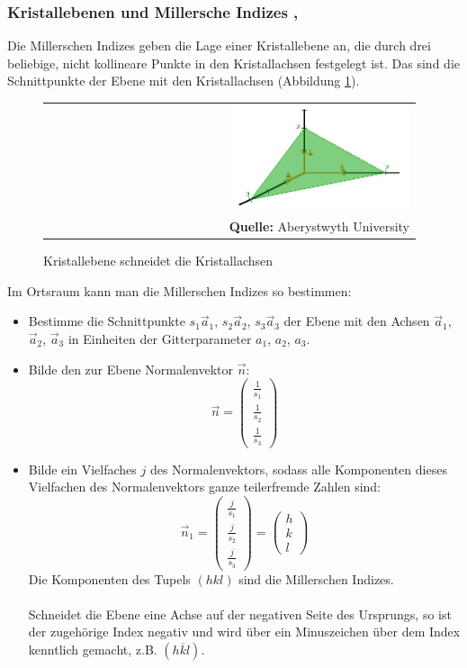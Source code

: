 \documentclass[a4paper,titlepage]{scrartcl}
\numberwithin{equation}{section}
\begin{document}
\subsubsection{Kristallebenen und Millersche Indizes \cite{wiki:miller}, \cite{kittel}}
Die Millerschen Indizes geben die Lage einer Kristallebene an, die durch drei beliebige, nicht kollineare Punkte in den Kristallachsen festgelegt ist. Das sind die Schnittpunkte der Ebene mit den Kristallachsen (Abbildung \ref{fig:miller}).
\begin{figure}[H]
	\centering
	\begin{tabular}{@{}r@{}}
		\includegraphics[width=0.5\textwidth]{images/bravaismiller.png}\\
		\footnotesize\sffamily\textbf{Quelle:} Aberystwyth University \cite{miller}
	\end{tabular}
	\caption{Kristallebene schneidet die Kristallachsen}
    \label{fig:miller}
\end{figure}
Im Ortsraum kann man die Millerschen Indizes so bestimmen:
\begin{itemize}
\item Bestimme die Schnittpunkte $s_1 \vec{a}_1$, $s_2 \vec{a}_2$, $s_3 \vec{a}_3$ der Ebene mit den Achsen $\vec{a}_1$, $\vec{a}_2$, $\vec{a}_3$ in Einheiten der Gitterparameter $a_1$, $a_2$, $a_3$.
\item Bilde den zur Ebene Normalenvektor $\vec{n}$:
\begin{equation*}
\vec{n}=\begin{pmatrix}\frac{1}{s_1}\\\frac{1}{s_2}\\\frac{1}{s_3}\end{pmatrix}
\end{equation*}
\item Bilde ein Vielfaches $j$ des Normalenvektors, sodass alle Komponenten dieses Vielfachen des Normalenvektors ganze teilerfremde Zahlen sind:
\begin{equation*}
\vec{n}_1=\begin{pmatrix}\frac{j}{s_1}\\\frac{j}{s_2}\\\frac{j}{s_3}\end{pmatrix}=\begin{pmatrix}h\\k\\l\end{pmatrix}
\end{equation*}
Die Komponenten des Tupels $(hkl)$ sind die Millerschen Indizes.\\ \\
Schneidet die Ebene eine Achse auf der negativen Seite des Ursprungs, so ist der zugehörige Index negativ und wird über ein Minuszeichen über dem Index kenntlich gemacht, z.B. $(h\overline{k}l)$.
\end{itemize}
\end{document}
